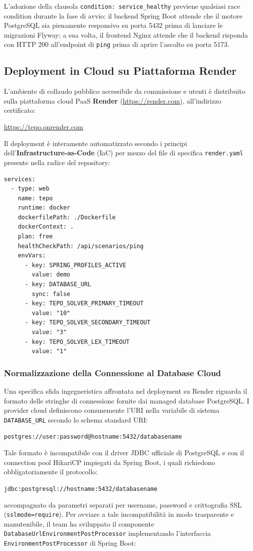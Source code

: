 L'adozione della clausola \texttt{condition: service\_healthy} previene qualsiasi race condition durante la fase di avvio: il backend Spring Boot attende che il motore PostgreSQL sia pienamente responsivo su porta 5432 prima di lanciare le migrazioni Flyway; a sua volta, il frontend Nginx attende che il backend risponda con HTTP 200 all'endpoint di \texttt{ping} prima di aprire l'ascolto su porta 5173.

\subsection{Deployment in Cloud su Piattaforma Render}
L'ambiente di collaudo pubblico accessibile da commissione e utenti è distribuito sulla piattaforma cloud PaaS \textbf{Render} (\url{https://render.com}), all'indirizzo certificato:
\begin{center}
    \url{https://tepo.onrender.com}
\end{center}

Il deployment è interamente automatizzato secondo i principi dell'\textbf{Infrastructure-as-Code} (IaC) per mezzo del file di specifica \texttt{render.yaml} presente nella radice del repository:

\begin{lstlisting}[caption={Estratto del blueprint Infrastructure-as-Code render.yaml.}]
services:
  - type: web
    name: tepo
    runtime: docker
    dockerfilePath: ./Dockerfile
    dockerContext: .
    plan: free
    healthCheckPath: /api/scenarios/ping
    envVars:
      - key: SPRING_PROFILES_ACTIVE
        value: demo
      - key: DATABASE_URL
        sync: false
      - key: TEPO_SOLVER_PRIMARY_TIMEOUT
        value: "10"
      - key: TEPO_SOLVER_SECONDARY_TIMEOUT
        value: "3"
      - key: TEPO_SOLVER_LEX_TIMEOUT
        value: "1"
\end{lstlisting}

\subsubsection{Normalizzazione della Connessione al Database Cloud}
Una specifica sfida ingegneristica affrontata nel deployment su Render riguarda il formato delle stringhe di connessione fornite dai managed database PostgreSQL. I provider cloud definiscono comunemente l'URI nella variabile di sistema \texttt{DATABASE\_URL} secondo lo schema standard URI:
\begin{center}
    \texttt{postgres://user:password@hostname:5432/databasename}
\end{center}
Tale formato è incompatibile con il driver JDBC ufficiale di PostgreSQL e con il connection pool HikariCP impiegati da Spring Boot, i quali richiedono obbligatoriamente il protocollo:
\begin{center}
    \texttt{jdbc:postgresql://hostname:5432/databasename}
\end{center}
accompagnato da parametri separati per username, password e crittografia SSL (\texttt{sslmode=require}).
Per ovviare a tale incompatibilità in modo trasparente e manutenibile, il team ha sviluppato il componente \texttt{DatabaseUrlEnvironmentPostProcessor} implementando l'interfaccia \texttt{EnvironmentPostProcessor} di Spring Boot:

